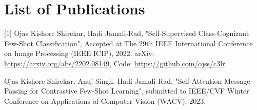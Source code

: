\chapter*{List of Publications}

[1] Ojas Kishore Shirekar, Hadi Jamali-Rad, "Self-Supervised Class-Cognizant Few-Shot Classification", Accepted at The 29th IEEE International Conference on Image Processing (IEEE ICIP), 2022. arXiv: \url{https://arxiv.org/abs/2202.08149}, Code: \url{https://github.com/ojss/c3lr}.

\noindent [2] Ojas Kishore Shirekar, Anuj Singh, Hadi Jamali-Rad, "Self-Attention Message Passing for Contrastive Few-Shot Learning", submitted to IEEE/CVF Winter Conference on Applications of Computer Vision (WACV), 2023.
